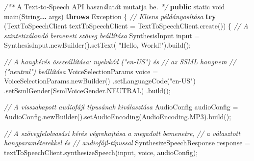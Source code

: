 \documentclass[
]{article}
\newenvironment{Shaded}{}{}
\newcommand{\BuiltInTok}[1]{\textcolor[rgb]{0.00,0.50,0.00}{#1}}
\newcommand{\CommentTok}[1]{\textcolor[rgb]{0.38,0.63,0.69}{\textit{#1}}}
\newcommand{\ControlFlowTok}[1]{\textcolor[rgb]{0.00,0.44,0.13}{\textbf{#1}}}
\newcommand{\DataTypeTok}[1]{\textcolor[rgb]{0.56,0.13,0.00}{#1}}
\newcommand{\FunctionTok}[1]{\textcolor[rgb]{0.02,0.16,0.49}{#1}}
\newcommand{\KeywordTok}[1]{\textcolor[rgb]{0.00,0.44,0.13}{\textbf{#1}}}
\newcommand{\NormalTok}[1]{#1}
\newcommand{\OperatorTok}[1]{\textcolor[rgb]{0.40,0.40,0.40}{#1}}
\newcommand{\StringTok}[1]{\textcolor[rgb]{0.25,0.44,0.63}{#1}}
\begin{document}
\begin{Shaded}
\begin{Highlighting}[]
  \CommentTok{/**}\NormalTok{ A Text}\CommentTok{{-}}\NormalTok{to}\CommentTok{{-}}\NormalTok{Speech API haszn}\CommentTok{á}\NormalTok{lat}\CommentTok{á}\NormalTok{t mutatja be}\CommentTok{. */}
  \KeywordTok{public} \DataTypeTok{static} \DataTypeTok{void} \FunctionTok{main}\OperatorTok{(}\BuiltInTok{String}\KeywordTok{...}\NormalTok{ args}\OperatorTok{)} \KeywordTok{throws} \BuiltInTok{Exception} \OperatorTok{\{}
    \CommentTok{// Kliens példányosítása}
    \ControlFlowTok{try} \OperatorTok{(}\NormalTok{TextToSpeechClient textToSpeechClient }\OperatorTok{=}\NormalTok{ TextToSpeechClient}\OperatorTok{.}\FunctionTok{create}\OperatorTok{())} \OperatorTok{\{}
      \CommentTok{// A szintetizálandó bemeneti szöveg beállítása}
\NormalTok{      SynthesisInput input }\OperatorTok{=}\NormalTok{ SynthesisInput}\OperatorTok{.}\FunctionTok{newBuilder}\OperatorTok{().}\FunctionTok{setText}\OperatorTok{(}
                              \StringTok{"Hello, World!"}\OperatorTok{).}\FunctionTok{build}\OperatorTok{();}

      \CommentTok{// A hangkérés összeállítása: nyelvkód ("en{-}US") és}
      \CommentTok{// az SSML hangnem}
      \CommentTok{// ("neutral") beállítása}
\NormalTok{      VoiceSelectionParams voice }\OperatorTok{=}
\NormalTok{          VoiceSelectionParams}\OperatorTok{.}\FunctionTok{newBuilder}\OperatorTok{()}
            \OperatorTok{.}\FunctionTok{setLanguageCode}\OperatorTok{(}\StringTok{"en{-}US"}\OperatorTok{)}
            \OperatorTok{.}\FunctionTok{setSsmlGender}\OperatorTok{(}\NormalTok{SsmlVoiceGender}\OperatorTok{.}\FunctionTok{NEUTRAL}\OperatorTok{)}
            \OperatorTok{.}\FunctionTok{build}\OperatorTok{();}

      \CommentTok{// A visszakapott audiofájl típusának kiválasztása}
\NormalTok{      AudioConfig audioConfig }\OperatorTok{=}
\NormalTok{          AudioConfig}\OperatorTok{.}\FunctionTok{newBuilder}\OperatorTok{().}\FunctionTok{setAudioEncoding}\OperatorTok{(}\NormalTok{AudioEncoding}\OperatorTok{.}\FunctionTok{MP3}\OperatorTok{).}\FunctionTok{build}\OperatorTok{();}

      \CommentTok{// A szövegfelolvasási kérés végrehajtása a megadott bemenetre,}
      \CommentTok{// a választott hangparaméterekkel és}
      \CommentTok{// audiofájl{-}típussal}
\NormalTok{      SynthesizeSpeechResponse response }\OperatorTok{=}
\NormalTok{          textToSpeechClient}\OperatorTok{.}\FunctionTok{synthesizeSpeech}\OperatorTok{(}\NormalTok{input}\OperatorTok{,}\NormalTok{ voice}\OperatorTok{,}\NormalTok{ audioConfig}\OperatorTok{);}


\end{Highlighting}
\end{Shaded}
\end{document}
